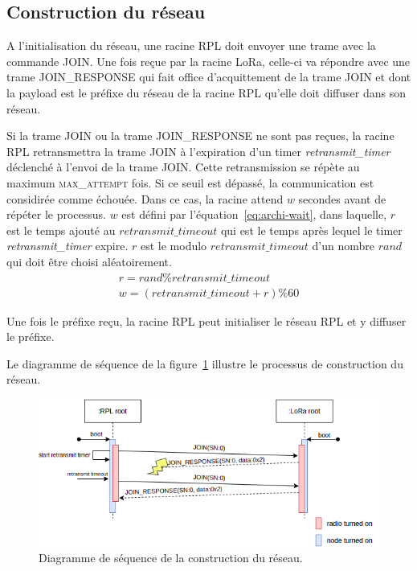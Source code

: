 \subsection*{Construction du réseau}%
    A l'initialisation du réseau, une racine RPL doit envoyer une trame avec la commande JOIN. Une 
    fois reçue par la racine LoRa, celle-ci va répondre avec une trame JOIN\_RESPONSE qui fait 
    office d'acquittement de la trame JOIN et dont la payload est le préfixe du réseau de la racine 
    RPL qu'elle doit diffuser dans son réseau.

    Si la trame JOIN ou la trame JOIN\_RESPONSE ne sont pas reçues, la racine RPL retransmettra la 
    trame JOIN à l'expiration d'un timer \textit{retransmit\_timer} déclenché à l'envoi de la trame 
    JOIN. Cette retransmission se répète au maximum \textsc{max\_attempt} fois. Si ce seuil est 
    dépassé, la communication est considirée comme échouée. Dans ce cas, la racine attend $w$ 
    secondes avant de répéter le processus. $w$ est défini par l'équation~\ref{eq:archi-wait}, 
    dans laquelle, $r$ est le temps ajouté au $retransmit\_timeout$ qui est le temps après lequel 
    le timer \textit{retransmit\_timer} expire. $r$ est le modulo $retransmit\_timeout$ d'un nombre 
    $rand$ qui doit être choisi aléatoirement.
    \begin{equation}\label{eq:archi-wait}
        \begin{split}
            r = rand \% retransmit\_timeout \\
            w = (retransmit\_timeout + r) \% 60
        \end{split}
    \end{equation}
    
    Une fois le préfixe reçu, la racine RPL peut initialiser le réseau RPL et y diffuser le préfixe.

    Le diagramme de séquence de la figure~\ref{fig:proto-seq-join} illustre le processus de construction du réseau.
    \begin{figure}[H]
        \centering
        \includegraphics[scale=0.6]{res/pictures/loramac-sequence-JOIN.drawio.png}
        \caption{Diagramme de séquence de la construction du réseau.}
        \label{fig:proto-seq-join}
    \end{figure}

